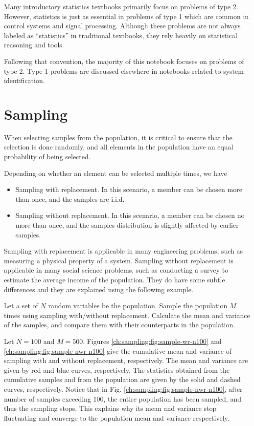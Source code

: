 Many introductory statistics textbooks primarily focus on problems of type 2. However, statistics is just as essential in problems of type 1 which are common in control systems and signal processing. Although these problems are not always labeled as ``statistics'' in traditional textbooks, they rely heavily on statistical reasoning and tools. 

Following that convention, the majority of this notebook focuses on problems of type 2. Type 1 problems are discussed elsewhere in notebooks related to system identification.

\section{Sampling}

When selecting samples from the population, it is critical to ensure that the selection is done randomly, and all elements in the population have an equal probability of being selected. 

Depending on whether an element can be selected multiple times, we have
\begin{itemize}
  \item Sampling with replacement. In this scenario, a member can be chosen more than once, and the samples are i.i.d.
  \item Sampling without replacement. In this scenario, a member can be chosen no more than once, and the samples distribution is slightly affected by earlier samples.
\end{itemize}
Sampling with replacement is applicable in many engineering problems, such as measuring a physical property of a system. Sampling without replacement is applicable in many social science problems, such as conducting a survey to estimate the average income of the population. They do have some subtle differences and they are explained using the following example.

Let a set of $N$ random variables be the population. Sample the population $M$ times using sampling with/without replacement. Calculate the mean and variance of the samples, and compare them with their counterparts in the population.

Let $N=100$ and $M=500$. Figures \ref{ch:sampling:fig:sample-wr-n100} and \ref{ch:sampling:fig:sample-nwr-n100} give the cumulative mean and variance of sampling with and without replacement, respectively. The mean and variance are given by red and blue curves, respectively. The statistics obtained from the cumulative samples and from the population are given by the solid and dashed curves, respectively. Notice that in Fig. \ref{ch:sampling:fig:sample-nwr-n100}, after number of samples exceeding $100$, the entire population has been sampled, and thus the sampling stops. This explains why its mean and variance stop fluctuating and converge to the population mean and variance respectively.

